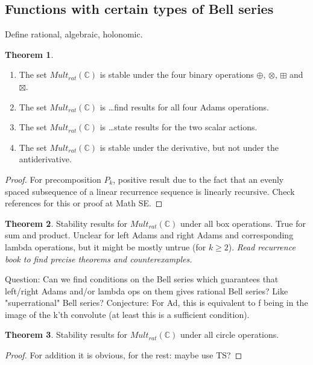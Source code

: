 \documentclass[a4paper]{article}
\theoremstyle{definition}
\newtheorem{theorem}{Theorem}[section]
\theoremstyle{remark}
\newcommand{\C}{\mathbb{C}}
\begin{document}
\subsection{Functions with certain types of Bell series}

Define rational, algebraic, holonomic.

\begin{theorem}
\begin{enumerate}
\item The set $Mult_{rat}(\C)$ is stable under the four binary operations $\oplus$, $\otimes$, $\boxplus$ and $\boxtimes$.
\item The set $Mult_{rat}(\C)$ is \ldots find results for all four Adams operations.
\item The set $Mult_{rat}(\C)$ is \ldots state results for the two scalar actions.
\item The set $Mult_{rat}(\C)$ is stable under the derivative, but not under the antiderivative.
\end{enumerate}
\end{theorem}
\begin{proof}
For precomposition $P_k$, positive result due to the fact that an evenly spaced subsequence of a linear recurrence sequence is linearly recursive. Check references for this or proof at Math SE.
\end{proof}

\begin{theorem}
Stability results for $Mult_{rat}(\mathbb{C})$ under all box operations. True for sum and product. Unclear for left Adams and right Adams and corresponding lambda operations, but it might be mostly untrue (for $k \geq 2$). \emph{Read recurrence book to find precise theorems and counterexamples.}
\end{theorem}

Question: Can we find conditions on the Bell series which guarantees that left/right Adams and/or lambda ops on them gives rational Bell series? Like "superrational" Bell series? Conjecture: For Ad, this is equivalent to f being in the image of the k'th convolute (at least this is a sufficient condition). 




\begin{theorem}
Stability results for $Mult_{rat}(\mathbb{C})$ under all circle operations.
\end{theorem}
\begin{proof}
For addition it is obvious, for the rest: maybe use TS?
\end{proof}
\end{document}
